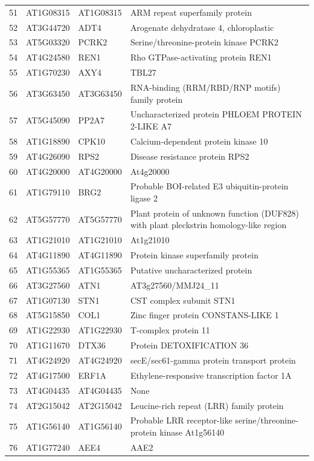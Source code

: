 \documentclass[11pt]{article}
\begin{document}
\begin{center}
\begin{tabular}{rlll}
51 & AT1G08315 & AT1G08315 & ARM repeat superfamily protein\\
52 & AT3G44720 & ADT4 & Arogenate dehydratase 4, chloroplastic\\
53 & AT5G03320 & PCRK2 & Serine/threonine-protein kinase PCRK2\\
54 & AT4G24580 & REN1 & Rho GTPase-activating protein REN1\\
55 & AT1G70230 & AXY4 & TBL27\\
56 & AT3G63450 & AT3G63450 & RNA-binding (RRM/RBD/RNP motifs) family protein\\
57 & AT5G45090 & PP2A7 & Uncharacterized protein PHLOEM PROTEIN 2-LIKE A7\\
58 & AT1G18890 & CPK10 & Calcium-dependent protein kinase 10\\
59 & AT4G26090 & RPS2 & Disease resistance protein RPS2\\
60 & AT4G20000 & AT4G20000 & At4g20000\\
61 & AT1G79110 & BRG2 & Probable BOI-related E3 ubiquitin-protein ligase 2\\
62 & AT5G57770 & AT5G57770 & Plant protein of unknown function (DUF828) with plant pleckstrin homology-like region\\
63 & AT1G21010 & AT1G21010 & At1g21010\\
64 & AT4G11890 & AT4G11890 & Protein kinase superfamily protein\\
65 & AT1G55365 & AT1G55365 & Putative uncharacterized protein\\
66 & AT3G27560 & ATN1 & AT3g27560/MMJ24\_11\\
67 & AT1G07130 & STN1 & CST complex subunit STN1\\
68 & AT5G15850 & COL1 & Zinc finger protein CONSTANS-LIKE 1\\
69 & AT1G22930 & AT1G22930 & T-complex protein 11\\
70 & AT1G11670 & DTX36 & Protein DETOXIFICATION 36\\
71 & AT4G24920 & AT4G24920 & secE/sec61-gamma protein transport protein\\
72 & AT4G17500 & ERF1A & Ethylene-responsive transcription factor 1A\\
73 & AT4G04435 & AT4G04435 & None\\
74 & AT2G15042 & AT2G15042 & Leucine-rich repeat (LRR) family protein\\
75 & AT1G56140 & AT1G56140 & Probable LRR receptor-like serine/threonine-protein kinase At1g56140\\
76 & AT1G77240 & AEE4 & AAE2\\

\end{tabular}
\end{center}
\end{document}
